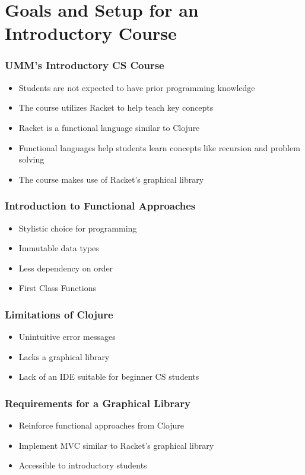 \documentclass{beamer}
\newcommand{\comment}[1]{}
\newcommand{\pscomment}[1]{\textcolor{red}{\comment{Paul: {#1}}}}
\begin{document}
\section{Goals and Setup for an Introductory Course}

\begin{frame}
\frametitle{UMM's Introductory CS Course}
\begin{itemize}
\item Students are not expected to have prior programming knowledge
\item The course utilizes Racket to help teach key concepts
\item Racket is a functional language similar to Clojure
\item Functional languages help students learn concepts like recursion and problem solving
\item The course makes use of Racket's graphical library 
\end{itemize}
\end{frame}

\begin{frame}
\frametitle{Introduction to Functional Approaches}
\begin{itemize}
\item Stylistic choice for programming
\item Immutable data types
\item Less dependency on order
\item First Class Functions
\end{itemize}
\end{frame}

\begin{frame}
\frametitle{Limitations of Clojure}
\begin{itemize}
\item Unintuitive error messages
\item Lacks a graphical library
\item Lack of an IDE suitable for beginner CS students
\end{itemize}
\end{frame}

\begin{frame}
\frametitle{Requirements for a Graphical Library}
\begin{itemize}
\item Reinforce functional approaches from Clojure
\item Implement MVC similar to Racket's graphical library
\item Accessible to introductory students
\end{itemize}
\pscomment{Add graphic for MVC}
\end{frame}
\end{document}
